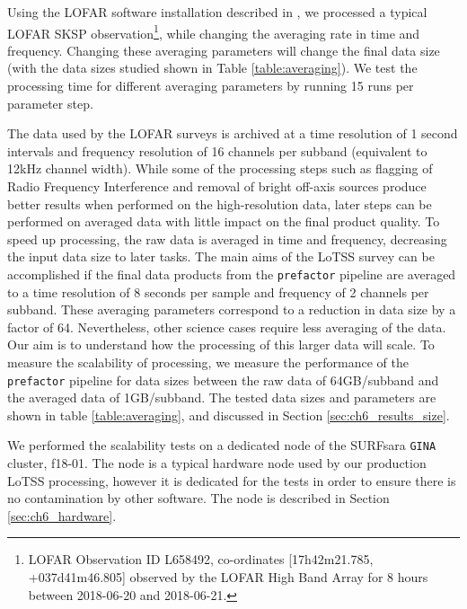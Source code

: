 Using the LOFAR software installation described in \cite{mechev17}, we processed a typical LOFAR SKSP observation\footnote{LOFAR Observation ID L658492, co-ordinates [17h42m21.785, +037d41m46.805] observed by the LOFAR High Band Array for 8 hours between 2018-06-20 and 2018-06-21.}, while changing the averaging rate  in time and frequency. Changing these averaging parameters will change the final data size (with the data sizes studied shown in Table \ref{table:averaging}). We test the processing time for different averaging parameters by running 15 runs per parameter step. 

The data used by the LOFAR surveys is archived at a time resolution of 1 second intervals and frequency resolution of 16 channels per subband (equivalent to 12kHz channel width). While some of the processing steps such as flagging of Radio Frequency Interference and removal of bright off-axis sources produce better results when performed on the high-resolution data, later steps can be performed on averaged data with little impact on the final product quality. To speed up processing, the raw data is averaged in time and frequency, decreasing the input data size to later tasks. The main aims of the LoTSS survey can be accomplished if the final data products from the \texttt{prefactor} pipeline are averaged to a time resolution of 8 seconds per sample and frequency of 2 channels per subband. These averaging parameters correspond to a reduction in data size by a factor of 64. Nevertheless, other science cases require less averaging of the data. Our aim is to understand how the processing of this larger data will scale. To measure the scalability of processing, we measure the performance of the \texttt{prefactor} pipeline for data sizes between the raw data of 64GB/subband and the averaged data of 1GB/subband. The tested data sizes and parameters are shown in table \ref{table:averaging}, and discussed in Section \ref{sec:ch6_results_size}.

We performed the scalability tests on a dedicated node of the SURFsara \texttt{GINA} cluster, f18-01. The node is a typical hardware node used by our production LoTSS processing, however it is dedicated for the tests in order to ensure there is no contamination by other software. The node is described in Section \ref{sec:ch6_hardware}. 
     

